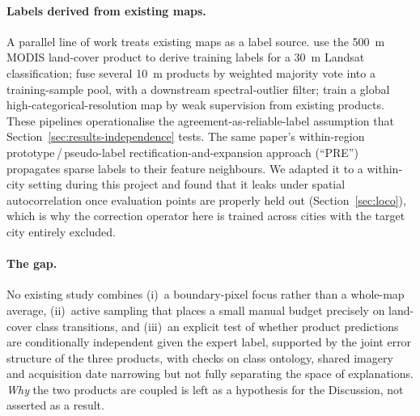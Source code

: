 \documentclass[remotesensing,article,submit,moreauthors]{Definitions/mdpi}
\begin{document}
\paragraph{Labels derived from existing maps.} A parallel line of work treats
existing maps as a label source. \citet{zhangroy2017} use the 500~m MODIS
land-cover product to derive training labels for a 30~m Landsat classification;
\citet{wang2024a} fuse several 10~m products by weighted majority vote into a
training-sample pool, with a downstream spectral-outlier filter;
\citet{tong2024pre} train a global high-categorical-resolution map by weak
supervision from existing products. These pipelines operationalise the
agreement-as-reliable-label assumption that Section~\ref{sec:results-independence}
tests. The same paper's within-region prototype\,/\,pseudo-label
rectification-and-expansion approach (``PRE'') propagates sparse labels to
their feature neighbours. We adapted it to a within-city setting during this
project and found that it leaks under spatial autocorrelation once evaluation
points are properly held out (Section~\ref{sec:loco}), which is why the
correction operator here is trained across cities with the target city entirely
excluded.

\paragraph{The gap.} No existing study combines (i)~a boundary-pixel focus
rather than a whole-map average, (ii)~active sampling that places a small
manual budget precisely on land-cover class transitions, and (iii)~an
explicit test of whether product predictions are conditionally independent
given the expert label, supported by the joint error structure of the
three products, with checks on class ontology, shared imagery and acquisition
date narrowing but not fully separating the space of explanations.
\emph{Why} the two products are coupled is left as a
hypothesis for the Discussion, not asserted as a result.

\end{document}
